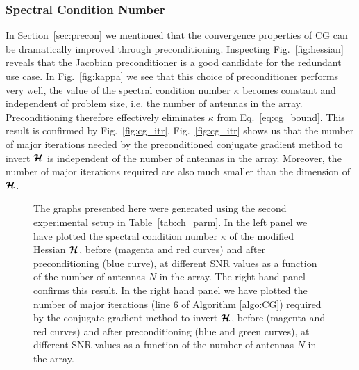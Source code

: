 \documentclass[useAMS,usenatbib]{mn2e}
\newcommand{\bmH}{\bmath{\mathcal{H}}}
\begin{document}
\subsubsection{Spectral Condition Number}
\label{sec:scn}
In Section~\ref{sec:precon} we mentioned that the convergence properties of CG can be dramatically improved through preconditioning. Inspecting Fig.~\ref{fig:hessian} reveals that the Jacobian preconditioner
is a good candidate for the redundant use case. In Fig.~\ref{fig:kappa} we see that this choice of preconditioner performs very well, the value of the spectral condition number $\kappa$
becomes constant and independent of problem size, i.e. the number of antennas in the array. Preconditioning therefore effectively eliminates $\kappa$ from Eq.~\eqref{eq:cg_bound}. This result
is confirmed by Fig.~\ref{fig:cg_itr}. Fig.~\ref{fig:cg_itr} shows us that the number of major iterations needed by the preconditioned conjugate gradient method to invert $\bmH$ is independent of the number of antennas in the array.
Moreover, the number of major iterations required are also much smaller than the dimension of $\bmH$. 

\begin{figure}
\centering
{}
\caption{The graphs presented here were generated using the second experimental setup in Table~\ref{tab:ch_parm}. In the left panel we have plotted the spectral condition number $\kappa$ of the modified Hessian $\bmH$, before (magenta and red curves) and after preconditioning (blue curve), at different SNR values as a function of the
number of antennas $N$ in the array. The right hand panel confirms this result. In the right hand panel we have plotted the number of major iterations (line 6 of Algorithm \ref{algo:CG}) required by the conjugate 
gradient method to invert $\bmH$, before (magenta and red curves) and after preconditioning (blue and green curves), at different SNR values as a function of the number of antennas $N$ in the array.   
\label{fig:kappa_itr}} 
\end{figure}
\end{document}

